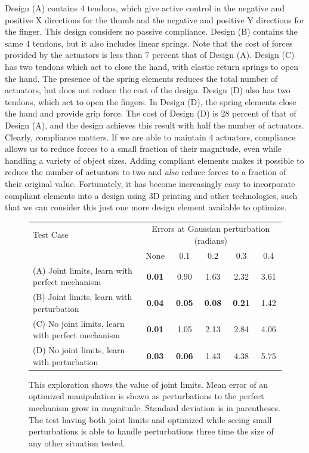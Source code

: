 Design (A) contains 4 tendons, which give active control in the negative and positive X directions for the thumb and the negative and positive Y directions for the finger.   This design considers no passive compliance.   Design (B) contains the same 4 tendons, but it also includes linear springs.   Note that the cost of forces provided by the actuators is less than 7 percent that of Design (A).    Design (C) has two tendons which act to close the hand, with elastic return springs to open the hand.    The presence of the spring elements reduces the total number of actuators, but does not reduce the cost of the design.    Design (D) also has two tendons, which act to open the fingers.    In Design (D), the spring elements close the hand and provide grip force.  The cost of Design (D) is 28 percent of that of Design (A), and the design achieves this result with half the number of actuators.    Clearly, compliance matters.   If we are able to maintain 4 actuators, compliance allows us to reduce forces to a small fraction of their magnitude, even while handling a variety of object sizes.   Adding compliant elements makes it possible to reduce the number of actuators to two and {\it also} reduce forces to a fraction of their original value.  Fortunately, it has become increasingly easy to incorporate compliant elements into a design using 3D printing and other technologies, such that we can consider this just one more design element available to optimize.

\begin{figure}
\begin{center}
\begin{tabular}{l|c|c|c|c|c|}
Test Case & \multicolumn{5}{c}{Errors at Gaussian perturbation (radians)}  \\
                & None & 0.1  & 0.2  & 0.3  &  0.4  \\ \hline 
(A) Joint limits, learn with perfect mechanism &	{\bf 0.01} & 0.90 & 1.63 &	2.32 & 3.61 \\
(B) Joint limits, learn with perturbation	&  {\bf 0.04}	& {\bf 0.05}	& {\bf 0.08} &	{\bf 0.21} &	1.42 \\
(C) No joint limits, learn with perfect mechanism &	{\bf 0.01}	&	1.05&	2.13	& 2.84  &	4.06 \\
(D) No joint limits, learn with perturbation &	{\bf 0.03}	& {\bf 0.06} 	&1.43	&4.38	&5.75 \\
\end{tabular}
\end{center}
\vspace*{-0.2in}
\caption{This exploration shows the value of joint limits.   Mean error of an optimized manipulation is shown as perturbations to the perfect mechanism grow in magnitude.    Standard deviation is in parentheses.  The test having both joint limits and optimized while seeing small perturbations is able to handle perturbations three time the size of any other situation tested.}
\label{JointLimitAnalysis}
\end{figure}

